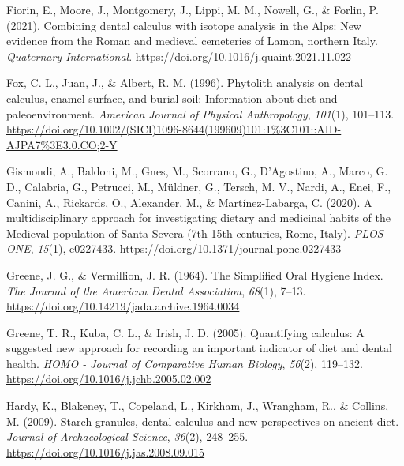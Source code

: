 \documentclass[
  letterpaper,
]{book}
\newlength{\cslhangindent}
\newlength{\cslentryspacingunit} %
\newenvironment{CSLReferences}[2] %
 {%
  \setlength{\parindent}{0pt}
  \ifodd #1
  \let\oldpar\par
  \def\par{\hangindent=\cslhangindent\oldpar}
  \fi
  \setlength{\parskip}{#2\cslentryspacingunit}
 }%
 {}
\begin{document}
\begin{CSLReferences}{1}{0}
\leavevmode{}%
Fiorin, E., Moore, J., Montgomery, J., Lippi, M. M., Nowell, G., \&
Forlin, P. (2021). Combining dental calculus with isotope analysis in
the {Alps}: {New} evidence from the {Roman} and medieval cemeteries of
{Lamon}, northern {Italy}. \emph{Quaternary International}.
\url{https://doi.org/10.1016/j.quaint.2021.11.022}

\leavevmode{}%
Fox, C. L., Juan, J., \& Albert, R. M. (1996). Phytolith analysis on
dental calculus, enamel surface, and burial soil: {Information} about
diet and paleoenvironment. \emph{American Journal of Physical
Anthropology}, \emph{101}(1), 101--113.
\url{https://doi.org/10.1002/(SICI)1096-8644(199609)101:1\%3C101::AID-AJPA7\%3E3.0.CO;2-Y}

\leavevmode{}%
Gismondi, A., Baldoni, M., Gnes, M., Scorrano, G., D'Agostino, A.,
Marco, G. D., Calabria, G., Petrucci, M., Müldner, G., Tersch, M. V.,
Nardi, A., Enei, F., Canini, A., Rickards, O., Alexander, M., \&
Martínez-Labarga, C. (2020). A multidisciplinary approach for
investigating dietary and medicinal habits of the {Medieval} population
of {Santa Severa} (7th-15th centuries, {Rome}, {Italy}). \emph{PLOS
ONE}, \emph{15}(1), e0227433.
\url{https://doi.org/10.1371/journal.pone.0227433}

\leavevmode{}%
Greene, J. G., \& Vermillion, J. R. (1964). The {Simplified Oral Hygiene
Index}. \emph{The Journal of the American Dental Association},
\emph{68}(1), 7--13.
\url{https://doi.org/10.14219/jada.archive.1964.0034}

\leavevmode{}%
Greene, T. R., Kuba, C. L., \& Irish, J. D. (2005). Quantifying
calculus: {A} suggested new approach for recording an important
indicator of diet and dental health. \emph{HOMO - Journal of Comparative
Human Biology}, \emph{56}(2), 119--132.
\url{https://doi.org/10.1016/j.jchb.2005.02.002}

\leavevmode{}%
Hardy, K., Blakeney, T., Copeland, L., Kirkham, J., Wrangham, R., \&
Collins, M. (2009). Starch granules, dental calculus and new
perspectives on ancient diet. \emph{Journal of Archaeological Science},
\emph{36}(2), 248--255. \url{https://doi.org/10.1016/j.jas.2008.09.015}


\end{CSLReferences}
\end{document}
